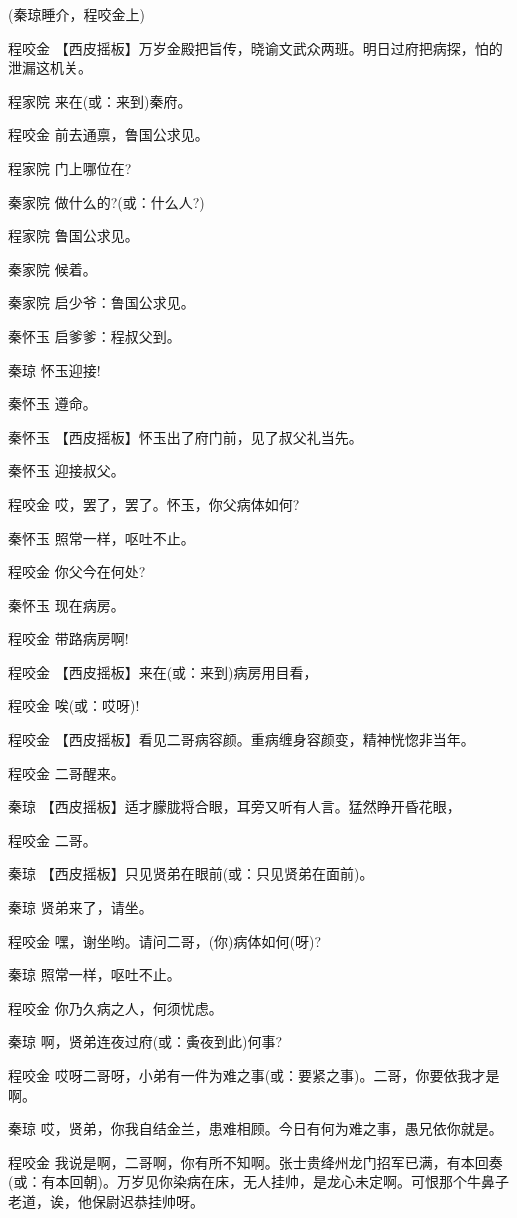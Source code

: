 (秦琼睡介，程咬金上)

程咬金
【西皮摇板】万岁金殿把旨传，晓谕文武众两班。明日过府把病探，怕的泄漏这机关。

程家院 来在(或：来到)秦府。

程咬金 前去通禀，鲁国公求见。

程家院 门上哪位在?

秦家院 做什么的?(或：什么人?)

程家院 鲁国公求见。

秦家院 候着。

秦家院 启少爷：鲁国公求见。

秦怀玉 启爹爹：程叔父到。

秦琼 怀玉迎接!

秦怀玉 遵命。

秦怀玉 【西皮摇板】怀玉出了府门前，见了叔父礼当先。

秦怀玉 迎接叔父。

程咬金 哎，罢了，罢了。怀玉，你父病体如何?

秦怀玉 照常一样，呕吐不止。

程咬金 你父今在何处?

秦怀玉 现在病房。

程咬金 带路病房啊!

程咬金 【西皮摇板】来在(或：来到)病房用目看，

程咬金 唉(或：哎呀)!

程咬金 【西皮摇板】看见二哥病容颜。重病缠身容颜变，精神恍惚非当年。

程咬金 二哥醒来。

秦琼 【西皮摇板】适才朦胧将合眼，耳旁又听有人言。猛然睁开昏花眼，

程咬金 二哥。

秦琼 【西皮摇板】只见贤弟在眼前(或：只见贤弟在面前)。

秦琼 贤弟来了，请坐。

程咬金 嘿，谢坐哟。请问二哥，(你)病体如何(呀)?

秦琼 照常一样，呕吐不止。

程咬金 你乃久病之人，何须忧虑。

秦琼 啊，贤弟连夜过府(或：夤夜到此)何事?

程咬金
哎呀二哥呀，小弟有一件为难之事(或：要紧之事)。二哥，你要依我才是啊。

秦琼 哎，贤弟，你我自结金兰，患难相顾。今日有何为难之事，愚兄依你就是。

程咬金
我说是啊，二哥啊，你有所不知啊。张士贵绛州龙门招军已满，有本回奏(或：有本回朝)。万岁见你染病在床，无人挂帅，是龙心未定啊。可恨那个牛鼻子老道，诶，他保尉迟恭挂帅呀。

